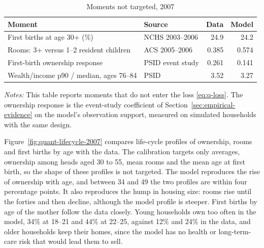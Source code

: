 \begin{table}[!htbp]
\centering
\caption{Moments not targeted, 2007}
\label{tab:quant-untargeted}
\small
\begin{tabularx}{\textwidth}{@{}X l r r@{}}
\toprule
Moment & Source & Data & Model \\
\midrule
First births at age 30+ (\%) & NCHS 2003--2006 & 24.9 & 24.2 \\
Rooms: 3+ versus 1--2 resident children & ACS 2005--2006 & 0.385 & 0.574 \\
First-birth ownership response & PSID event study & 0.261 & 0.141 \\
Wealth/income p90 / median, ages 76--84 & PSID & 3.52 & 3.27 \\
\bottomrule
\end{tabularx}
\par\smallskip
\begin{minipage}{0.95\linewidth}
\footnotesize\textit{Notes:} This table reports moments that do not enter
the loss \eqref{eq:q-loss}. The ownership response is the event-study
coefficient of Section~\ref{sec:empirical-evidence} on the model's
observation support, measured on simulated households with the same design.
\end{minipage}
\end{table}

Figure~\ref{fig:quant-lifecycle-2007} compares life-cycle profiles of
ownership, rooms and first births by age with the data. The calibration
targets only averages, ownership among heads aged 30 to 55, mean rooms and
the mean age at first birth, so the shape of these profiles is not
targeted. The model reproduces the rise of ownership with
age, and between 34 and 49 the two profiles are within four percentage
points. It also reproduces the hump in housing size: rooms rise until the
forties and then decline, although the model profile is steeper. First
births by age of the mother follow the data closely. Young households own
too often in the model, 34\% at 18--21 and 44\% at 22--25, against 12\% and
24\% in the data, and older households keep their homes, since the model has
no health or long-term-care risk that would lead them to sell.

